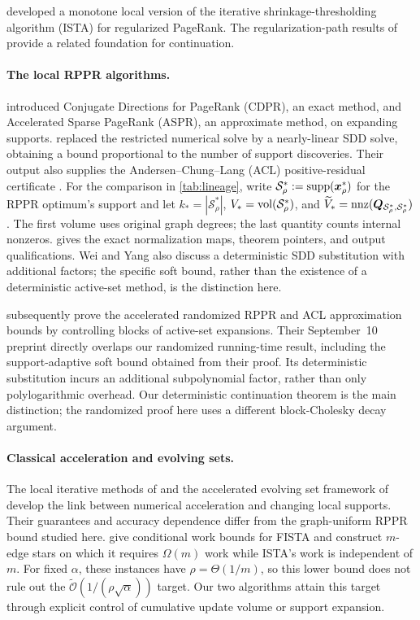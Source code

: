 \citet{fountoulakis2019variational} developed a monotone local version of
the iterative shrinkage-thresholding algorithm (ISTA) for regularized
PageRank. The regularization-path results of \citet{ha2021statistical}
provide a related foundation for continuation.

\paragraph{The local RPPR algorithms.}
\citet{martinezrubio2023accelerated} introduced Conjugate Directions for
PageRank (CDPR), an exact method, and Accelerated Sparse PageRank (ASPR),
an approximate method, on expanding supports.
\citet{wei2026simple} replaced the restricted numerical solve by a
nearly-linear SDD solve, obtaining a bound proportional to the number
of support discoveries. Their output also supplies the Andersen--Chung--Lang
(ACL) positive-residual certificate \citep{andersen2006local}.
For the comparison in \cref{tab:lineage}, write $\mathcal S_\rho^*:=\operatorname{supp}(\bm{x}_\rho^*)$ for the RPPR optimum's
support and let $k_*=|\mathcal S_\rho^*|$,
$V_*=\operatorname{vol}(\mathcal S_\rho^*)$, and
$\widetilde V_*=\operatorname{nnz}(\bm{Q}_{\mathcal S_\rho^*,\mathcal S_\rho^*})$.
The first volume uses original graph degrees; the last quantity counts
internal nonzeros.  gives the exact normalization
maps, theorem pointers, and output qualifications. Wei and Yang also discuss a deterministic SDD substitution with
additional factors; the specific soft bound, rather than the existence
of a deterministic active-set method, is the distinction here.

\citet{cui2026accelerating} subsequently prove the accelerated randomized
RPPR and ACL approximation bounds by controlling blocks of active-set
expansions. Their September~10 preprint directly overlaps our randomized
running-time result, including the support-adaptive soft bound obtained
from their proof. Its deterministic substitution incurs an additional
subpolynomial factor, rather than only polylogarithmic overhead.
Our deterministic continuation theorem is the main distinction;
the randomized proof here uses a different block-Cholesky decay argument.

\paragraph{Classical acceleration and evolving sets.}
The local iterative methods of
\citet{zhou2024iterative} and the accelerated evolving
set framework of \citet{huang2025accelerated} develop the link between
numerical acceleration and changing local supports. Their guarantees and
accuracy dependence differ from the graph-uniform RPPR bound studied here.
\citet{fountoulakis2026complexity} give conditional work bounds for FISTA
and construct $m$-edge stars on which it requires $\Omega(m)$ work while
ISTA's work is independent of $m$. For fixed $\alpha$, these instances have
$\rho=\Theta(1/m)$, so this lower bound does not rule out the
$\widetilde{\mathcal{O}}(1/(\rho\sqrt\alpha))$ target. Our two algorithms
attain this target through explicit control of cumulative update volume
or support expansion.

